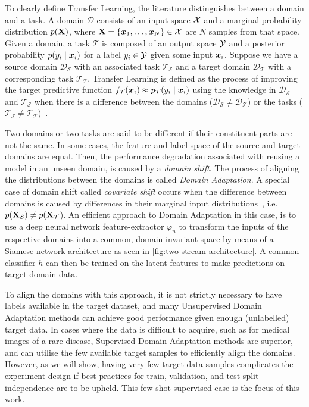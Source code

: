 \documentclass[journal]{IEEEtran}
\renewcommand{\vector}[1]{\ensuremath{\bm{\lowercase{#1}}}}
\renewcommand{\matrix}[1]{\ensuremath{\bm{\mathbf{\uppercase{#1}}}}}
\newcommand{\vx}{\vector{x}}
\newcommand{\mX}{\matrix{x}}
\newcommand{\Domain}{\mathscr{D}} \newcommand{\Task}{\mathscr{T}} \newcommand{\concept}[1]{\ensuremath{\mathcal{\uppercase{#1}}}}
\newcommand{\Src}{\mathcal{S}} \newcommand{\Tgt}{\mathcal{T}}
\begin{document}
To clearly define Transfer Learning, the literature distinguishes between a domain and a task. A domain $\Domain$ consists of an input space $\concept{X}$ and a marginal probability distribution $p(\mX)$, where $\mX = \{\vx_1, \dots, \vx_N\} \in \concept{X}$ are $N$ samples from that space. Given a domain, a task $\Task$ is composed of an output space $\concept{Y}$ and a posterior probability $p(y_i \mid \vx_i)$ for a label $y_i \in \concept{Y}$ given some input $\vx_i$. 
Suppose we have a source domain $\Domain_\Src$ with an associated task $\Task_\Src$ and a target domain $\Domain_\Tgt$ with a corresponding task $\Task_\Tgt$. Transfer Learning is defined as the  process of improving the target predictive function $f_\Tgt(\vx_i) \approx p_\Tgt(y_i \mid \vx_i)$ using the knowledge in  $\Domain_\Src$ and $\Task_\Src$ when there is a difference between the domains ($\Domain_\Src \neq \Domain_\Tgt$) or the tasks ($\Task_\Src \neq \Task_\Tgt$)~\cite{pan2010survey}. 

Two domains or two tasks are said to be different if their constituent parts are not the same. 
In some cases, the feature and label space of the source and target domains are equal. Then, the performance degradation associated with reusing a model in an unseen domain, is caused by a \textit{domain shift}. The process of aligning the distributions between the domains is called \textit{Domain Adaptation}. A special case of domain shift called \textit{covariate shift} occurs when the difference between domains is caused by differences in their marginal input distributions~\cite{kouw2018introduction}, i.e. $p(\mX_\Src) \neq p(\mX_\Tgt$).
An efficient approach to Domain Adaptation in this case, is to use a deep neural network feature-extractor $\varphi_n$ to transform the inputs of the respective domains into a common, domain-invariant space by means of a Siamese network architecture as seen in \cref{fig:two-stream-architecture}. A common classifier $h$ can then be trained on the latent features to make predictions on target domain data.

To align the domains with this approach, it is not strictly necessary to have labels available in the target dataset, and many Unsupervised Domain Adaptation methods can achieve good performance given enough (unlabelled) target data. In cases where the data is difficult to acquire, such as for medical images of a rare disease, Supervised Domain Adaptation methods are superior, and can utilise the few available target samples to efficiently align the domains. 
However, as we will show, having very few target data samples complicates the experiment design if best practices for train, validation, and test split independence are to be upheld.
This few-shot supervised case is the focus of this work.
\end{document}
